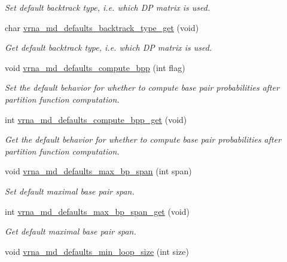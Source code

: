 \begin{DoxyCompactItemize}
\begin{DoxyCompactList}\small\item\em Set default backtrack type, i.\+e. which DP matrix is used. \end{DoxyCompactList}\item 
char \hyperlink{group__model__details_ga1425b4ebd0e034dead66d79becd64143}{vrna\+\_\+md\+\_\+defaults\+\_\+backtrack\+\_\+type\+\_\+get} (void)
\begin{DoxyCompactList}\small\item\em Get default backtrack type, i.\+e. which DP matrix is used. \end{DoxyCompactList}\item 
void \hyperlink{group__model__details_gaf1b5db10f1f476767f9a95f8a78e3132}{vrna\+\_\+md\+\_\+defaults\+\_\+compute\+\_\+bpp} (int flag)
\begin{DoxyCompactList}\small\item\em Set the default behavior for whether to compute base pair probabilities after partition function computation. \end{DoxyCompactList}\item 
int \hyperlink{group__model__details_gaa3a537e61fbe0518673bf9f73fd820f3}{vrna\+\_\+md\+\_\+defaults\+\_\+compute\+\_\+bpp\+\_\+get} (void)
\begin{DoxyCompactList}\small\item\em Get the default behavior for whether to compute base pair probabilities after partition function computation. \end{DoxyCompactList}\item 
void \hyperlink{group__model__details_ga4c4bc962f09b4480cb8499f1cf8ae4ec}{vrna\+\_\+md\+\_\+defaults\+\_\+max\+\_\+bp\+\_\+span} (int span)
\begin{DoxyCompactList}\small\item\em Set default maximal base pair span. \end{DoxyCompactList}\item 
int \hyperlink{group__model__details_gaa60f989e062fecd4d4bac89c1883da85}{vrna\+\_\+md\+\_\+defaults\+\_\+max\+\_\+bp\+\_\+span\+\_\+get} (void)
\begin{DoxyCompactList}\small\item\em Get default maximal base pair span. \end{DoxyCompactList}\item 
void \hyperlink{group__model__details_gac152f1e78c1058a10261022c8dfda0f7}{vrna\+\_\+md\+\_\+defaults\+\_\+min\+\_\+loop\+\_\+size} (int size)

\end{DoxyCompactItemize}
